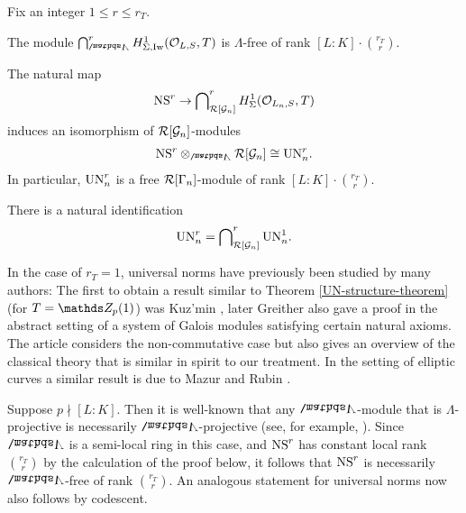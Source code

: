\documentclass[a4paper, 
headsepline=off, DIV=12, titlepage=false]{scrartcl}
\begin{document}
\begin{thm} \label{UN-structure-theorem}
Fix an integer $1 \leq r \leq r_T$. 
\begin{liste}
\item The module $\bidual^r_\bLambda H^1_{\Sigma, \text{Iw}} ( \cO_{L, S}, T)$ is $\Lambda$-free of rank $[L : K] \cdot \binom{r_T}{r}$.
\item{The natural map
            \begin{align*}
                \mathrm{NS}^r \to \bigcap\nolimits_{\mathcal{R}[\mathcal{G}_n]}^r H^1_\Sigma(\mathcal{O}_{L_n, S}, T)
            \end{align*}
            induces an isomorphism of $\mathcal{R}[\mathcal{G}_n]$-modules
            \begin{align*}
                \NS^r \otimes_{\bLambda} \cR[\cG_n] \cong \UN_n^r.
            \end{align*}
            In particular, $\mathrm{UN}_n^{r}$ is a free $\mathcal{R}[\Gamma_n]$-module of rank $[L:K]\cdot{r_T \choose r}$.
        }
	\item There is a natural identification
	\[
	\mathrm{UN}^r_n = \bigcap\nolimits^r_{\mathcal{R} [\mathcal{G}_n]} \mathrm{UN}^1_n.
	\]
\end{liste}
\end{thm}

\begin{rk} \label{structure-theorem-remark}\text{}
\begin{liste}
\item In the case of $r_T = 1$, universal norms have previously been studied by many authors: The first to obtain a result similar to Theorem \ref{UN-structure-theorem} (for $T = \Z_p (1)$) was Kuz'min \cite{Kuzmin},
later Greither \cite{Greither} also gave a proof in the abstract setting of a system of Galois modules satisfying certain natural axioms. The article \cite{kato2006universal} considers the non-commutative case but also gives an overview of the classical theory that is similar in spirit to our treatment. 
In the setting of elliptic curves a similar result is due to Mazur and Rubin \cite[Theorem 4.2]{MazurRubin03}.
\item Suppose $p \nmid [L:K]$. Then it is well-known that any $\bLambda$-module that is $\Lambda$-projective is necessarily $\bLambda$-projective (see, for example, \cite[Lem. 5.4.16]{NSW}). Since $\bLambda$ is a semi-local ring in this case, and $\mathrm{NS}^{r}$ has constant local rank ${r_T \choose r}$ by the calculation of the proof below, it follows that $\mathrm{NS}^{r}$ is necessarily $\bLambda$-free of rank ${r_T \choose r}$. An analogous statement for universal norms now also follows by codescent. 
\end{liste}
\end{rk}
\end{document}
